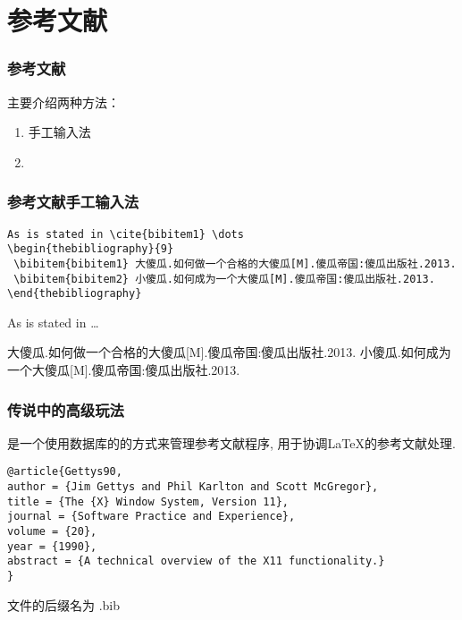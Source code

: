 \section{参考文献}
\begin{frame}[fragile]\frametitle{参考文献}
主要介绍两种方法：
\begin{enumerate}
    \item<2-> 手工输入法
    \item<3-> \BibTeX{}
\end{enumerate}
\end{frame}

\begin{frame}[fragile]\frametitle{参考文献手工输入法}
\begin{block}{}
    \begin{verbatim}
As is stated in \cite{bibitem1} \dots
\begin{thebibliography}{9}
 \bibitem{bibitem1} 大傻瓜.如何做一个合格的大傻瓜[M].傻瓜帝国:傻瓜出版社.2013.
 \bibitem{bibitem2} 小傻瓜.如何成为一个大傻瓜[M].傻瓜帝国:傻瓜出版社.2013.
\end{thebibliography}
    \end{verbatim}
\end{block}
\begin{block}{}
As is stated in \cite{bibitem1} \dots
\begin{thebibliography}{9}
  大傻瓜.如何做一个合格的大傻瓜[M].傻瓜帝国:傻瓜出版社.2013.
  小傻瓜.如何成为一个大傻瓜[M].傻瓜帝国:傻瓜出版社.2013.
\end{thebibliography}
\end{block}
\end{frame}

\begin{frame}[fragile]\frametitle{传说中的高级玩法\BibTeX{}}
\BibTeX{} 是一个使用数据库的的方式来管理参考文献程序, 用于协调LaTeX的参考文献处理.
\begin{block}{}
    \begin{verbatim}
@article{Gettys90,
author = {Jim Gettys and Phil Karlton and Scott McGregor},
title = {The {X} Window System, Version 11},
journal = {Software Practice and Experience},
volume = {20},
year = {1990},
abstract = {A technical overview of the X11 functionality.}
}
    \end{verbatim}
\end{block}
\BibTeX{} 文件的后缀名为 .bib
\end{frame}

